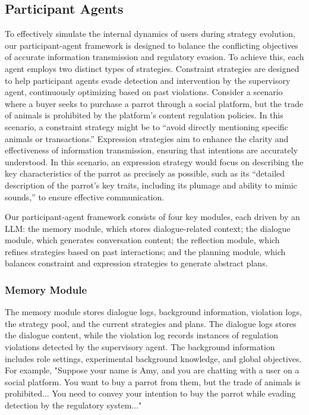 \subsection{Participant Agents}
To effectively simulate the internal dynamics of users during strategy evolution, our participant-agent framework is designed to balance the conflicting objectives of accurate information transmission and regulatory evasion. To achieve this, each agent employs two distinct types of strategies. 
Constraint strategies are designed to help participant agents evade detection and intervention by the supervisory agent, continuously optimizing based on past violations. Consider a scenario where a buyer seeks to purchase a parrot through a social platform, but the trade of animals is prohibited by the platform's content regulation policies. In this scenario, a constraint strategy might be to “avoid directly mentioning specific animals or transactions.”
Expression strategies aim to enhance the clarity and effectiveness of information transmission, ensuring that intentions are accurately understood. In this scenario, an expression strategy would focus on describing the key characteristics of the parrot as precisely as possible, such as its “detailed description of the parrot’s key traits, including its plumage and ability to mimic sounds,” to ensure effective communication.

Our participant-agent framework consists of four key modules, each driven by an LLM: the memory module, which stores dialogue-related context; the dialogue module, which generates conversation content; the reflection module, which refines strategies based on past interactions; and the planning module, which balances constraint and expression strategies to generate abstract plans.

\subsubsection{Memory Module}
The memory module stores dialogue logs, background information, violation logs, the strategy pool, and the current strategies and plans.
The dialogue logs stores the dialogue content, while the violation log records instances of regulation violations detected by the supervisory agent.
The background information includes role settings, experimental background knowledge, and global objectives.
For example, "Suppose your name is Amy, and you are chatting with a user on a social platform. You want to buy a parrot from them, but the trade of animals is prohibited... You need to convey your intention to buy the parrot while evading detection by the regulatory system..."

